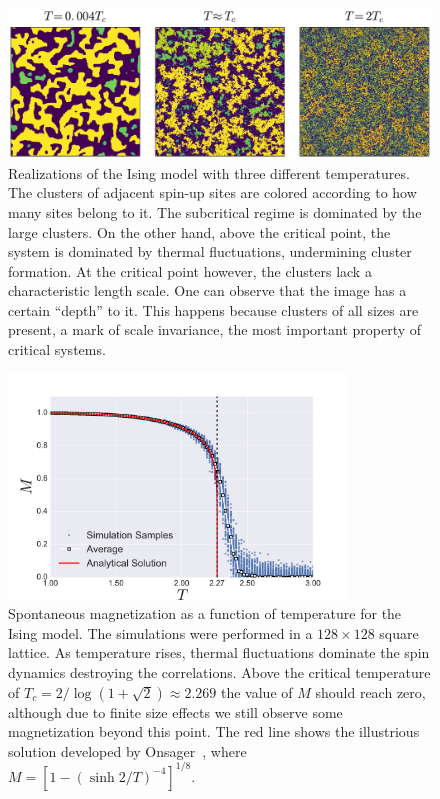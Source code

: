 \begin{figure}
\begin{center}
    \includegraphics[width=\textwidth]{chapters/ch2-crit/figs/ising}
\end{center}
\caption{Realizations of the Ising model with three different
    temperatures. The clusters of adjacent spin-up sites are colored according
    to how many sites belong to it. The subcritical regime is dominated by the
    large clusters. On the other hand, above the critical point, the system is
    dominated by thermal fluctuations, undermining cluster formation. At the
    critical point however, the clusters lack a characteristic length scale.
    One can observe that the image has a certain ``depth'' to it. This happens
    because clusters of all sizes are present, a mark of scale invariance,
    the most important property of critical systems.}
\label{fig:ising}
\end{figure}

\begin{figure}
\begin{center}
    \includegraphics[width=0.8\textwidth]{chapters/ch2-crit/figs/ising_phase}
\end{center}
\caption{Spontaneous magnetization as a function of temperature for the Ising
    model. The simulations were performed in a $128\times128$ square lattice.
    As temperature rises, thermal fluctuations dominate the spin dynamics
    destroying the correlations. Above the critical temperature of
    $T_c=2/\log(1+\sqrt{2})\approx 2.269$ the value of $M$ should reach zero,
    although due to finite size effects we still observe some magnetization
    beyond this point. The red line shows the illustrious solution
    developed by Onsager~\cite{Onsager1944}, where
    $M={[1-{(\sinh{2/T})}^{-4}]}^{1/8}$.}
\label{fig:ising_phase}
\end{figure}

